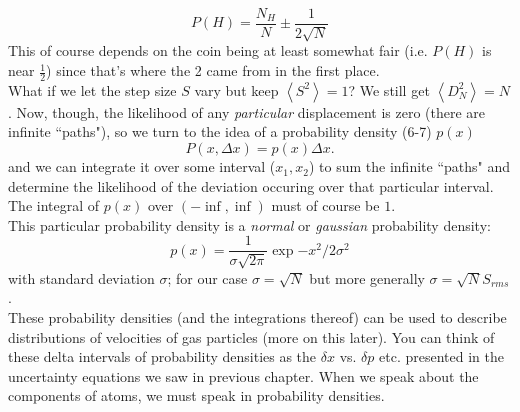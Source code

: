 \documentclass[10pt,letterpaper]{article}
\begin{document}
$$ P(H) = \frac{N_H}{N} \pm \frac{1}{2\sqrt{N}} $$ 
This of course depends on the coin being at least somewhat fair (i.e. $P(H)$ is near $\frac{1}{2}$) since that's where the 2 came from in the first place. \\
\indent What if we let the step size $S$ vary but keep $\left<S^2\right> = 1$? We still get $\left<D^2_N\right> = N$. Now, though, the likelihood of any \textit{particular} displacement is zero (there are infinite ``paths"), so we turn to the idea of a probability density (6-7) $p(x)$
$$P(x, \Delta x) = p(x) \Delta x. $$ 
and we can integrate it over some interval ($x_1, x_2$) to sum the infinite ``paths" and determine the likelihood of the deviation occuring over that particular interval. The integral of $p(x)$ over $(-\inf, \inf)$ must of course be $1$. \\
\indent This particular probability density is a \textit{normal} or \textit{gaussian} probability density:
$$ p(x) = \frac{1}{\sigma\sqrt{2\pi}}\exp{-x^2/2\sigma^2} $$ with standard deviation $\sigma$; for our case $\sigma = \sqrt{N}$ but more generally $\sigma = \sqrt{N}S_{rms}$. \\
\indent These probability densities (and the integrations thereof) can be used to describe distributions of velocities of gas particles (more on this later). You can think of these delta intervals of probability densities as the $\delta x$ vs. $\delta p$ etc. presented in the uncertainty equations we saw in previous chapter. When we speak about the components of atoms, we must speak in probability densities. 
\end{document}

